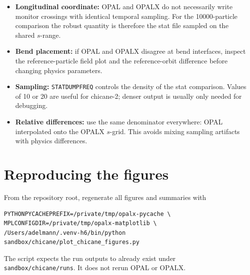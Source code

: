 \documentclass[11pt,a4paper]{article}
\begin{document}
\begin{itemize}
  \item \textbf{Longitudinal coordinate:} OPAL and OPALX do not necessarily
        write monitor crossings with identical temporal sampling.  For the
        10000-particle comparison the robust quantity is therefore the stat
        file sampled on the shared \(s\)-range.
  \item \textbf{Bend placement:} if OPAL and OPALX disagree at bend
        interfaces, inspect the reference-particle field plot and the
        reference-orbit difference before changing physics parameters.
  \item \textbf{Sampling:} \texttt{STATDUMPFREQ} controls the density of the
        stat comparison.  Values of 10 or 20 are useful for chicane-2; denser
        output is usually only needed for debugging.
  \item \textbf{Relative differences:} use the same denominator everywhere:
        OPAL interpolated onto the OPALX \(s\)-grid.  This avoids mixing
        sampling artifacts with physics differences.
\end{itemize}

\section{Reproducing the figures}

From the repository root, regenerate all figures and summaries with
\begin{verbatim}
PYTHONPYCACHEPREFIX=/private/tmp/opalx-pycache \
MPLCONFIGDIR=/private/tmp/opalx-matplotlib \
/Users/adelmann/.venv-h6/bin/python sandbox/chicane/plot_chicane_figures.py
\end{verbatim}
The script expects the run outputs to already exist under
\texttt{sandbox/chicane/runs}.  It does not rerun OPAL or OPALX.
\end{document}
